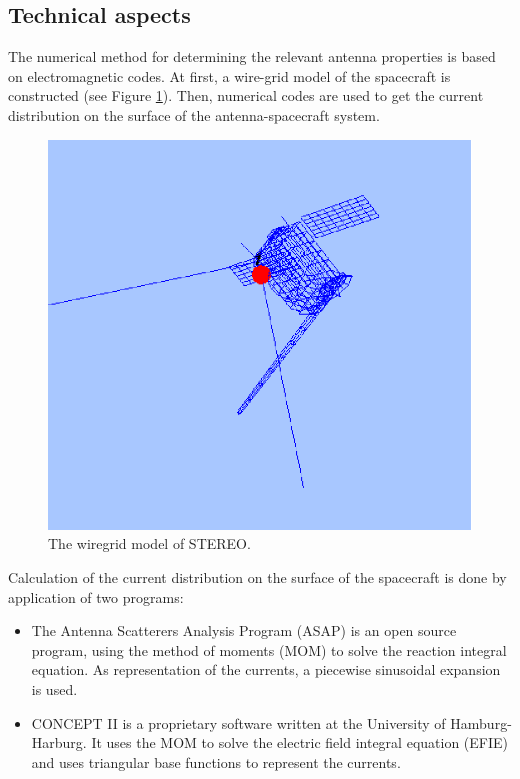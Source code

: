\documentclass[a4paper,twocolumn]{esapub2005} %
\begin{document}
\subsection{Technical aspects}
The numerical method for determining the relevant antenna properties is based on electromagnetic codes. At first, a wire-grid model of the spacecraft is constructed (see Figure \ref{fig2}). Then, numerical codes are used to get the current distribution on the surface of the antenna-spacecraft system.

\begin{figure}
\centering
  \includegraphics[width=1.0\linewidth]{paperpics2/fig2.eps}
\caption{The wiregrid model of STEREO.\label{fig2}}
\end{figure}

Calculation of the current distribution on the surface of the spacecraft is done by application of two programs:

\begin{itemize}
    \item The Antenna Scatterers Analysis Program (ASAP) is an open source program, using the method of moments (MOM) to solve the reaction integral equation. As representation of the currents, a piecewise sinusoidal expansion is used.
\item CONCEPT II is a proprietary software written at the University of Hamburg-Harburg. It uses the MOM to solve the electric field integral equation (EFIE) and uses triangular base functions to represent the currents.\end{itemize}
\end{document}
